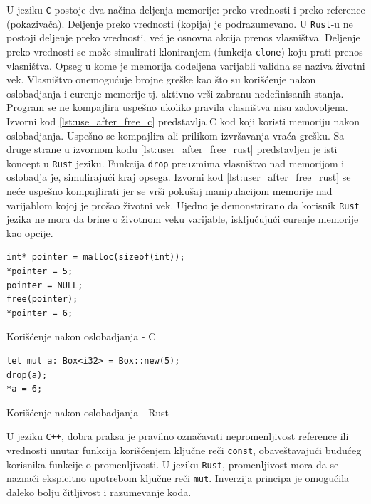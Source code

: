 \documentclass[11pt]{article}
\begin{document}
U jeziku \verb|C| postoje dva načina deljenja 
memorije: preko vrednosti i preko reference (pokazivača). Deljenje preko vrednosti (kopija) je
podrazumevano. U \verb|Rust|-u ne postoji deljenje preko vrednosti, već je osnovna akcija prenos vlasništva.
Deljenje preko vrednosti se može simulirati kloniranjem (funkcija \verb|clone|) koju prati prenos vlasništva.
Opseg u kome je memorija dodeljena varijabli validna 
se naziva životni vek. Vlasništvo onemogućuje brojne greške kao što su korišćenje nakon oslobadjanja i curenje 
memorije tj. aktivno vrši zabranu nedefinisanih stanja. Program se ne kompajlira uspešno ukoliko pravila 
vlasništva nisu zadovoljena. Izvorni kod \ref{lst:use_after_free_c} predstavlja C kod koji koristi memoriju 
nakon oslobadjanja. Uspešno se kompajlira ali prilikom izvršavanja vraća grešku. Sa druge strane u izvornom 
kodu \ref{lst:user_after_free_rust} predstavljen je isti koncept u \verb|Rust| jeziku. Funkcija 
\verb|drop| preuzmima vlasništvo nad memorijom 
i oslobadja je, simulirajući kraj opsega. Izvorni kod \ref{lst:user_after_free_rust} se neće 
uspešno kompajlirati jer se vrši pokušaj manipulacijom memorije nad varijablom kojoj je prošao životni vek.
Ujedno je demonstrirano da korisnik \verb|Rust| jezika ne mora da brine o životnom veku varijable, isključujući
curenje memorije kao opcije.

\begin{multicols}{2}
    \begin{listing}[H]
    \begin{verbatim}
int* pointer = malloc(sizeof(int));
*pointer = 5;
pointer = NULL;
free(pointer);
*pointer = 6; 
    \end{verbatim}
    \caption{Korišćenje nakon oslobadjanja - C}
    \label{lst:use_after_free_c}
    \end{listing}
    \columnbreak
    \begin{listing}[H]
    \begin{verbatim}
let mut a: Box<i32> = Box::new(5);
drop(a);
*a = 6;
    \end{verbatim}
    \caption{Korišćenje nakon oslobadjanja - Rust}
    \label{lst:user_after_free_rust}
    \end{listing}
\end{multicols}

U jeziku \verb|C++|, dobra praksa je pravilno označavati nepromenljivost reference ili vrednosti
unutar funkcija korišćenjem ključne reči \verb|const|, obaveštavajući budućeg korisnika funkcije 
o promenljivosti. U jeziku \verb|Rust|, promenljivost mora da se naznači ekspicitno upotrebom ključne 
reči \verb|mut|. Inverzija principa je omogućila daleko bolju čitljivost i razumevanje koda.
\end{document}
